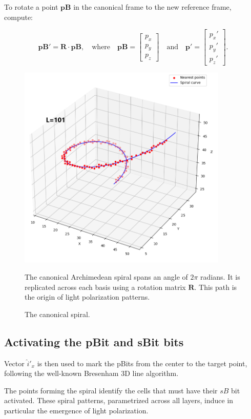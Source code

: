 \documentclass[12pt,english]{article}
\begin{document}
To rotate a point $\mathbf{pB}$ in the canonical frame to the new reference frame, compute:

\[
\mathbf{pB}' = \mathbf{R} \cdot \mathbf{pB}, \quad
\text{where} \quad
\mathbf{pB} =
\begin{bmatrix} p_x \\ p_y \\ p_z \end{bmatrix}
\quad \text{and} \quad
\mathbf{p}' =
\begin{bmatrix} p_x' \\ p_y' \\ p_z' \end{bmatrix}.
\]

\begin{figure}
\centering
\includegraphics[width=10cm]{fig3}
\caption{The canonical spiral.}
\footnotesize{The canonical Archimedean spiral spans an angle of \(2\pi\) radians. It is replicated across each basis using a rotation matrix \( \mathbf{R} \). This path is the origin of light polarization patterns.}
\label{fig3}
\end{figure}

\subsection{Activating the pBit and sBit bits}
Vector $\hat{i}'_x$ is then used to mark the pBits from the center to the target point, following the well-known Bresenham 3D line algorithm. 

The points forming the spiral identify the cells that must have their $sB$ bit activated. These spiral patterns, parametrized across all layers, induce in particular the emergence of light polarization.
\end{document}
